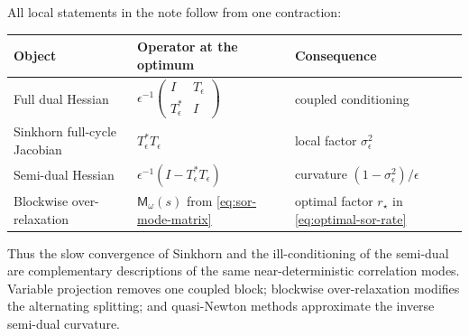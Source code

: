 \documentclass[11pt]{article}
\theoremstyle{definition}
\theoremstyle{remark}
\newcommand{\eps}{\epsilon}
\begin{document}
All local statements in the note follow from one contraction:
\begin{center}
\begin{tabular}{@{}lll@{}}
\toprule
Object & Operator at the optimum & Consequence \\
\midrule
Full dual Hessian
& $\eps^{-1}\left(\begin{smallmatrix}I&T_\eps\\T_\eps^\ast&I\end{smallmatrix}\right)$
& coupled conditioning \\
Sinkhorn full-cycle Jacobian
& $T_\eps^\ast T_\eps$
& local factor $\sigma_\eps^2$ \\
Semi-dual Hessian
& $\eps^{-1}(I-T_\eps^\ast T_\eps)$
& curvature $(1-\sigma_\eps^2)/\eps$ \\
Blockwise over-relaxation
& $\mathsf M_\omega(s)$ from \eqref{eq:sor-mode-matrix}
& optimal factor $r_\star$ in \eqref{eq:optimal-sor-rate} \\
\bottomrule
\end{tabular}
\end{center}
Thus the slow convergence of Sinkhorn and the ill-conditioning of the
semi-dual are complementary descriptions of the same near-deterministic
correlation modes. Variable projection removes one coupled block;
blockwise over-relaxation modifies the alternating splitting; and
quasi-Newton methods approximate the inverse semi-dual curvature.
\end{document}
